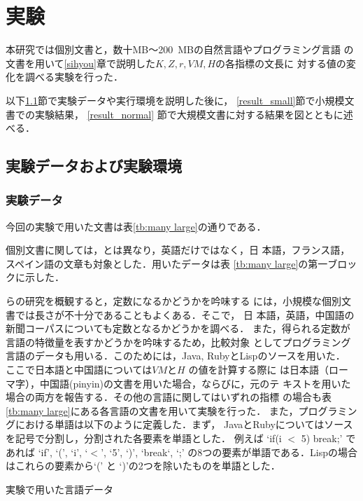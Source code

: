 \documentclass[japanese]{jnlp_JS2.0}
\begin{document}
\section{実験}

本研究では個別文書と，数十MB〜200~MBの自然言語やプログラミング言語
の文書を用いて\ref{sihyou}章で説明した$K, Z, r, VM, H$の各指標の文長に
対する値の変化を調べる実験を行った．


以下\ref{env}節で実験データや実行環境を説明した後に，
\ref{result_small}節で小規模文書での実験結果，
\ref{result_normal}
節で大規模文書に対する結果を図とともに述べる．


\subsection{実験データおよび実験環境}
\label{env}

\subsubsection{実験データ}

今回の実験で用いた文書は表\ref{tb:many large}の通りである．

個別文書に関しては，\cite{BaayenTweedie}とは異なり，英語だけではなく，日
本語，フランス語， スペイン語の文章も対象とした．用いたデータは表
\ref{tb:many large}の第一ブロックに示した．

\cite{BaayenTweedie}らの研究を概観すると，定数になるかどうかを吟味する
には，小規模な個別文書では長さが不十分であることもよくある．そこで， 日
本語，英語，中国語の新聞コーパスについても定数となるかどうかを調べる．
また，得られる定数が言語の特徴量を表すかどうかを吟味するため，比較対象
としてプログラミング言語のデータも用いる．このためには，Java,
RubyとLispのソースを用いた．
ここで日本語と中国語については$\mathit{VM}$と$H$ の値を計算する際に
は日本語（ローマ字），中国語(pinyin)の文書を用いた場合，ならびに，元のテ
キストを用いた場合の両方を報告する．その他の言語に関してはいずれの指標
の場合も表\ref{tb:many large}にある各言語の文書を用いて実験を行った．
また，プログラミングにおける単語は以下のように定義した．まず，
JavaとRubyについてはソースを記号で分割し，分割された各要素を単語とした．
例えば `if(i $<$ 5) break;' であれば `if', `(', `i', `$<$', `5', `)',
`break`, `;' の8つの要素が単語である．Lispの場合はこれらの要素から`(' と
`)'の2つを除いたものを単語とした．

 \begin{table}[t]
  \caption{実験で用いた言語データ}
  \label{tb:many large}

  \end{table}
\end{document}
